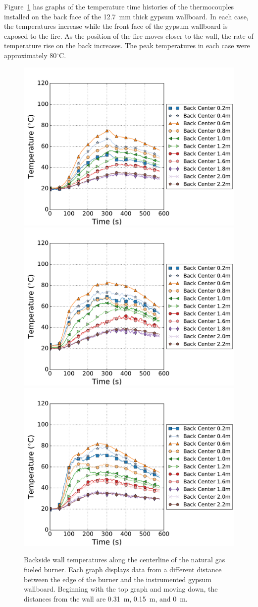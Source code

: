\documentclass[twoside]{uocthesis}
\begin{document}
{Figure~\ref{IWGB_NG_TC_Backside_set} has graphs of the temperature time histories of the thermocouples installed on the back face of the 12.7~mm thick gypsum wallboard.  In each case, the temperatures increase while the front face of the gypsum wallboard is exposed to the fire.  As the position of the fire moves closer to the wall, the rate of temperature rise on the back increases.  The peak temperatures in each case were approximately 80$^\circ$C.   

\begin{figure}[ht!]
	\centering
	\includegraphics[width=.625\columnwidth]{../Figures/IWGBNG01_TC_Back_Center_Avg}\\
	\includegraphics[width=.625\columnwidth]{../Figures/IWGBNG04_TC_Back_Center_Avg}\\
	\includegraphics[width=.625\columnwidth]{../Figures/IWGBNG05_TC_Back_Center_Avg}\\
	\caption[Backside wall temperatures for the natural gas fueled burner]{Backside wall temperatures along the centerline of the natural gas fueled burner. Each graph displays data from a different distance between the edge of the burner and the instrumented gypsum wallboard.  Beginning with the top graph and moving down, the distances from the wall are 0.31~m, 0.15~m, and 0~m.}
	\label{IWGB_NG_TC_Backside_set}
\end{figure}

}
\end{document}
